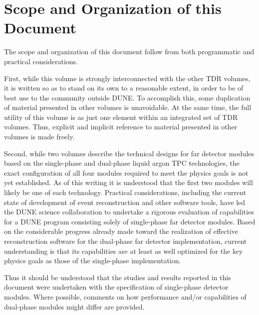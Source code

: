 \section{Scope and Organization of this Document}
\label{sec:exec-scope}

The scope and organization of this document follow from
both programmatic and practical considerations.

First, while this volume is strongly interconnected with
the other TDR volumes, it is written so as to stand on its
own to a reasonable extent, in order to be of best use to the
community outside DUNE.  To accomplish this, some duplication
of material presented in other volumes is unavoidable.
At the same time, the full utility of this volume
is as just one element within an integrated set of TDR volumes.
Thus, explicit and implicit reference
to material presented in other volumes is made freely.

Second, while two volumes describe the technical designs
for far detector modules based on the single-phase and
dual-phase liquid argon TPC technologies, the exact
configuration of all four modules required to meet the
physics goals is not yet established.  As of this writing
it is understood that the first two modules will likely
be one of each technology.  Practical considerations,
including the current state of development of event
reconstruction and other software tools, have
led the DUNE science collaboration to undertake a rigorous
evaluation of capabilities for a DUNE program consisting
solely of single-phase far detector modules.  Based
on the considerable progress already made toward the
realization of effective reconstruction software for the
dual-phase far detector implementation, current
understanding is that its capabilities are at least
as well optimized for the key physics goals as those of
the single-phase implementation.

Thus it should be understood that the studies and results
reported in this document were undertaken with the
specification of single-phase detector modules.  Where possible,
comments on how performance and/or capabilities of
dual-phase modules might differ are provided.





